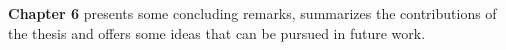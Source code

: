 \textbf{Chapter 6} presents some concluding remarks, summarizes the contributions of the thesis and offers some ideas that can be pursued in future work.



